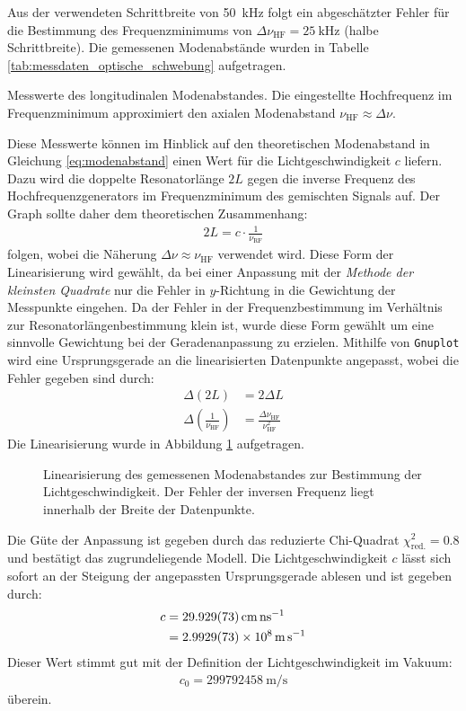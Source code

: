 \documentclass[11pt, a4paper]{article}
\numberwithin{equation}{section}
\begin{document}
Aus der verwendeten Schrittbreite von \SI{50}{\kilo\hertz} folgt ein abgeschätzter Fehler für die Bestimmung des Frequenzminimums von $\Delta \nu_\mathrm{HF} = \SI{25}{\kilo\hertz}$ (halbe Schrittbreite).
Die gemessenen Modenabstände wurden in Tabelle \ref{tab:messdaten_optische_schwebung} aufgetragen.
\begin{table}[h]
	\centering
	
	\caption{Messwerte des longitudinalen Modenabstandes. Die eingestellte Hochfrequenz im Frequenzminimum approximiert den axialen Modenabstand $\nu_\mathrm{HF} \approx \Delta \nu$.}
	\label{tab:messdaten_optische_schwebung}
\end{table}

Diese Messwerte können im Hinblick auf den theoretischen Modenabstand in Gleichung \ref{eq:modenabstand} einen Wert für die Lichtgeschwindigkeit $c$ liefern.
Dazu wird die doppelte Resonatorlänge $2 L$ gegen die inverse Frequenz des Hochfrequenzgenerators im Frequenzminimum des gemischten Signals auf.
Der Graph sollte daher dem theoretischen Zusammenhang:
\begin{align}
	2 L = c \cdot \frac{1}{\nu_\mathrm{RF}}
\end{align}
folgen, wobei die Näherung $\Delta \nu \approx \nu_\mathrm{HF}$ verwendet wird.
Diese Form der Linearisierung wird gewählt, da bei einer Anpassung mit der \emph{Methode der kleinsten Quadrate} nur die Fehler in $y$-Richtung in die Gewichtung der Messpunkte eingehen.
Da der Fehler in der Frequenzbestimmung im Verhältnis zur Resonatorlängenbestimmung klein ist, wurde diese Form gewählt um eine sinnvolle Gewichtung bei der Geradenanpassung zu erzielen.
Mithilfe von \texttt{Gnuplot} wird eine Ursprungsgerade an die linearisierten Datenpunkte angepasst, wobei die Fehler gegeben sind durch:
\begin{align}
\Delta(2L) &= 2 \Delta L \\
\Delta \left( \frac{1}{\nu_\mathrm{HF}} \right) &= \frac{\Delta \nu_\mathrm{HF}}{\nu_\mathrm{HF}^2}
\end{align}
Die Linearisierung wurde in Abbildung \ref{fig:linearisierung_modenabstand} aufgetragen.
\begin{figure}[h]
	\centering
	
	\caption{Linearisierung des gemessenen Modenabstandes zur Bestimmung der Lichtgeschwindigkeit. Der Fehler der inversen Frequenz liegt innerhalb der Breite der Datenpunkte.}
	\label{fig:linearisierung_modenabstand}
\end{figure}
Die Güte der Anpassung ist gegeben durch das reduzierte Chi-Quadrat $\chi_\mathrm{red.}^2 = \num{0.8}$ und bestätigt das zugrundeliegende Modell.
Die Lichtgeschwindigkeit $c$ lässt sich sofort an der Steigung der angepassten Ursprungsgerade ablesen und ist gegeben durch:
\begin{align}
	c &= \SI{29.929 +- 0.073}{\centi\metre\per\nano\second} \nonumber\\
	&= \SI{2.9929 +- 0.0073 e8}{\metre\per\second}
\end{align}
Dieser Wert stimmt gut mit der Definition der Lichtgeschwindigkeit im Vakuum:
\begin{align}
	c_0 = \SI{299792458}{\metre\per\second}
\end{align}
überein.
\end{document}
